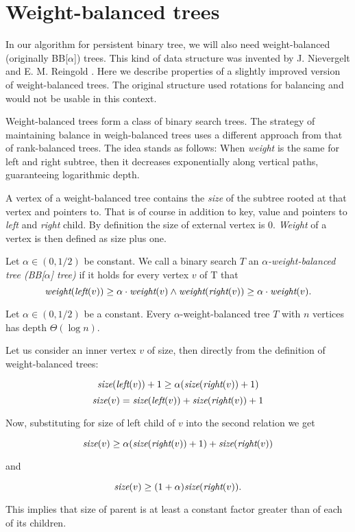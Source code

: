 \section{Weight-balanced trees}

In our algorithm for persistent binary tree, we will also need weight-balanced (originally BB[$\alpha$]) trees. This kind of data structure was invented by J. Nievergelt and E. M. Reingold \cite{weight-balanced}. Here we describe properties of a slightly improved version of weight-balanced trees. The original structure used rotations for balancing and would not be usable in this context.

Weight-balanced trees form a class of binary search trees. The strategy of maintaining balance in weigh-balanced trees uses a different approach from that of rank-balanced trees. The idea stands as follows: When \emph{weight} is the same for left and right subtree, then it decreases exponentially along vertical paths, guaranteeing logarithmic depth.

A vertex of a weight-balanced tree contains the {\em size} of the subtree rooted at that vertex and pointers to. That is of course in addition to key, value and pointers to {\em left} and {\em right} child. By definition the size of external vertex is 0. {\em Weight} of a vertex is then defined as size plus one.

\begin{defn}
Let $\alpha \in (0,1/2)$ be constant. We call a binary search $T$ an {\em $\alpha$-weight-balanced tree (BB[$\alpha$] tree)} if it holds for every vertex $v$ of T that 
$$\text{\it weight}(\text{\it left}(v)) \geq \alpha \cdot \text{\it weight}(v) \wedge \text{\it weight}(\text{\it right}(v)) \geq \alpha \cdot \text{\it weight}(v). $$
\end{defn}

\begin{prop}
Let $\alpha \in (0,1/2)$ be a constant. Every $\alpha$-weight-balanced tree $T$ with $n$ vertices has depth $\Theta(\log n)$. 
\end{prop}

\begin{myproof}
Let us consider an inner vertex $v$ of size, then directly from the definition of weight-balanced trees:

$$ \text{\it size}(\text{\it left}(v)) + 1 \geq \alpha (\text{\it size}(\text{\it right}(v))+1)$$
$$ \text{\it size}(v) = \text{\it size}(\text{\it left}(v)) + \text{\it size}(\text{\it right}(v)) + 1 $$

Now, substituting for size of left child of $v$ into the second relation we get

$$ \text{\it size}(v) \geq \alpha (\text{\it size}(\text{\it right}(v)) + 1) + \text{\it size}(\text{\it right}(v)) $$

and

$$ \text{\it size}(v) \geq (1+\alpha)\text{\it size}(\text{\it right}(v)).$$

This implies that size of parent is at least a constant factor greater than of each of its children.
\end{myproof}

